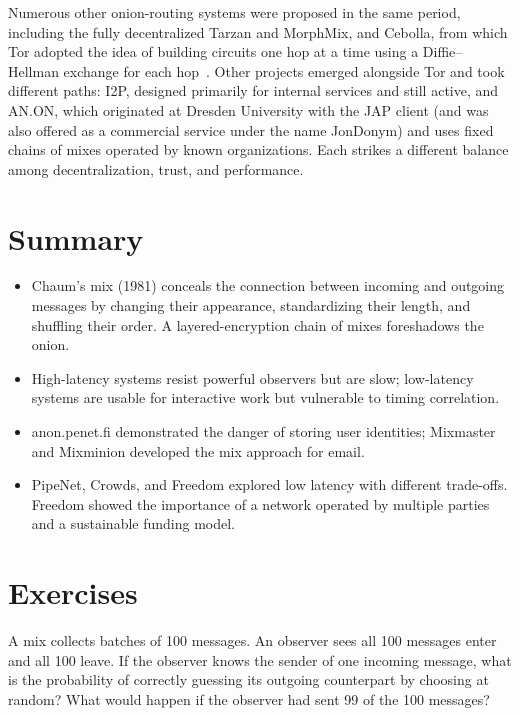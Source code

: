 \begin{approfondimento}
Numerous other onion-routing systems were proposed in the same period, including the fully decentralized Tarzan and MorphMix, and Cebolla, from which Tor adopted the idea of building circuits one hop at a time using a Diffie--Hellman exchange for each hop~\cite{syverson2011peel}. Other projects emerged alongside Tor and took different paths: I2P, designed primarily for internal services and still active, and AN.ON, which originated at Dresden University with the JAP client (and was also offered as a commercial service under the name JonDonym) and uses fixed chains of mixes operated by known organizations. Each strikes a different balance among decentralization, trust, and performance.
\end{approfondimento}

\section*{Summary}
\begin{itemize}
  \item Chaum's mix (1981) conceals the connection between incoming and outgoing messages by changing their appearance, standardizing their length, and shuffling their order. A layered-encryption chain of mixes foreshadows the onion.
  \item High-latency systems resist powerful observers but are slow; low-latency systems are usable for interactive work but vulnerable to timing correlation.
  \item anon.penet.fi demonstrated the danger of storing user identities; Mixmaster and Mixminion developed the mix approach for email.
  \item PipeNet, Crowds, and Freedom explored low latency with different trade-offs. Freedom showed the importance of a network operated by multiple parties and a sustainable funding model.
\end{itemize}

\section*{Exercises}

\begin{esercizio}[1]\label{es:02-mix}
A mix collects batches of 100 messages. An observer sees all 100 messages enter and all 100 leave. If the observer knows the sender of one incoming message, what is the probability of correctly guessing its outgoing counterpart by choosing at random? What would happen if the observer had sent 99 of the 100 messages?
\end{esercizio}

